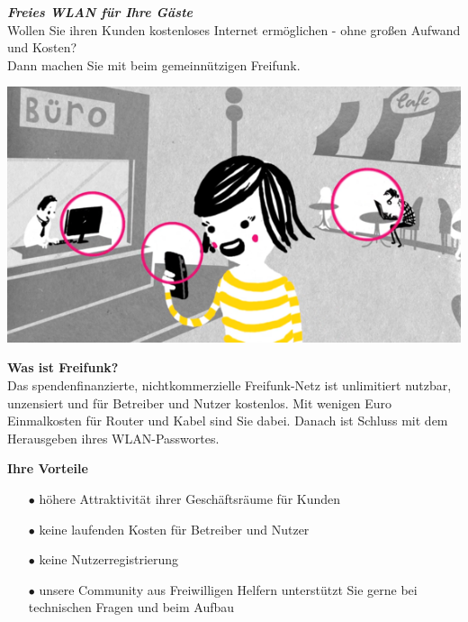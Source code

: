 \documentclass[a4paper]{article}
\begin{document}
\thispagestyle{empty}

\begin{center}
  \Huge \textit{\textbf{\textcolor{freifunkpink}{Freies WLAN für Ihre Gäste}}} \\
  \vspace{0.6cm}
  \large Wollen Sie ihren Kunden kostenloses Internet ermöglichen - ohne großen Aufwand und Kosten?\\
  Dann machen Sie mit beim gemeinnützigen Freifunk.\\
  \normalsize

  \vspace{1.25cm}
  \hspace*{-0.05 \paperwidth}\includegraphics[width=\paperwidth]{../images/city_center}
\end{center}

\vspace{0.6cm}

\begin{Row}
  \begin{Cell}{1}
    \textbf{Was ist Freifunk?}\\
    Das spendenfinanzierte, nichtkommerzielle Freifunk-Netz ist unlimitiert nutzbar, unzensiert und für Betreiber und Nutzer kostenlos. Mit wenigen Euro Einmalkosten für Router und Kabel sind Sie dabei. Danach ist Schluss mit dem Herausgeben ihres WLAN-Passwortes.
  \end{Cell}
  \begin{Cell}{1}
    \textbf{Ihre Vorteile} \vspace*{-0.18cm}
    \begin{itemize}
      \item[\textcolor{freifunkpink}{\Large$\bullet$}] höhere Attraktivität ihrer Geschäftsräume für Kunden
      \vspace*{-0.3cm}
      \item[\textcolor{freifunkpink}{\Large$\bullet$}] keine laufenden Kosten für Betreiber und Nutzer\vspace*{-0.3cm}
      \item[\textcolor{freifunkpink}{\Large$\bullet$}] keine Nutzerregistrierung
      \vspace*{-0.3cm}
      \item[\textcolor{freifunkpink}{\Large$\bullet$}] unsere Community aus Freiwilligen Helfern unterstützt Sie gerne bei technischen Fragen und beim Aufbau
    \end{itemize}
  \end{Cell}
\end{Row}
\end{document}
